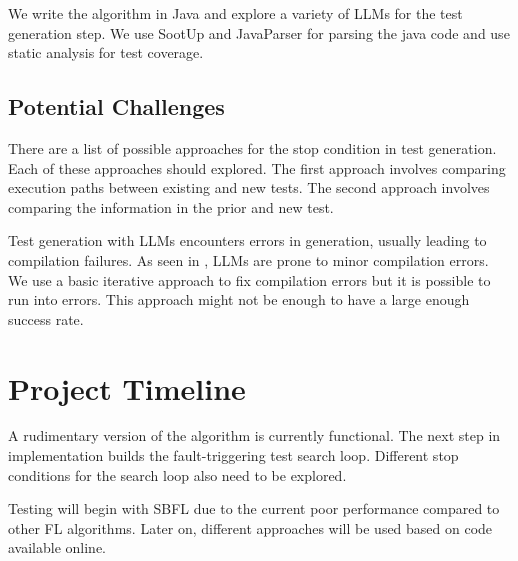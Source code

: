 \documentclass[conference]{IEEEtran}
\begin{document}
We write the algorithm in Java and explore a variety of LLMs for the test generation step. We use SootUp and JavaParser for parsing the java code and use static analysis for test coverage.

\subsection{Potential Challenges}

There are a list of possible approaches for the stop condition in test generation. Each of these approaches should explored. The first approach involves comparing execution paths between existing and new tests. The second approach involves comparing the information in the prior and new test.

Test generation with LLMs encounters errors in generation, usually leading to compilation failures. As seen in \cite{konstantinou2025yate}, LLMs are prone to minor compilation errors. We use a basic iterative approach to fix compilation errors but it is possible to run into errors. This approach might not be enough to have a large enough success rate.

\section{Project Timeline}

A rudimentary version of the algorithm is currently functional. The next step in implementation builds the fault-triggering test search loop. Different stop conditions for the search loop also need to be explored.

Testing will begin with SBFL due to the current poor performance compared to other FL algorithms. Later on, different approaches will be used based on code available online.


\end{document}
